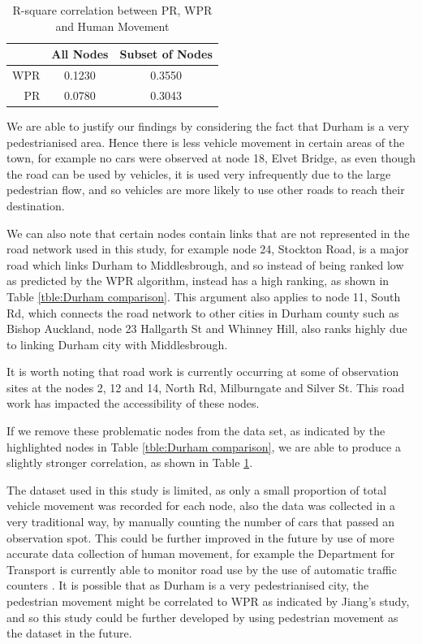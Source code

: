 \documentclass[11pt]{report}
\begin{document}
\begin{table}\caption{R-square correlation between PR, WPR and Human Movement}
\centering
\begin{tabular}{r| c|c}
 & All Nodes& Subset of Nodes \\
 \hline
 WPR & 0.1230 & 0.3550\\
 PR & 0.0780 & 0.3043\\ 
\end{tabular}
\label{tble:Correlation}
\end{table}

We are able to justify our findings by considering the fact that Durham is a very pedestrianised area. Hence there is less vehicle movement in certain areas of the town, for example no cars were observed at node 18, Elvet Bridge, as even though the road can be used by vehicles, it is used very infrequently due to the large pedestrian flow, and so vehicles are more likely to use other roads to reach their destination. 

We can also note that certain nodes contain links that are not represented in the road network used in this study, for example node 24, Stockton Road, is a major road which links Durham to Middlesbrough, and so instead of being ranked low as predicted by the WPR algorithm, instead has a high ranking, as shown in Table \ref{tble:Durham comparison}. This argument also applies to node 11, South Rd, which connects the road network to other cities in Durham county such as Bishop Auckland, node 23 Hallgarth St and Whinney Hill, also ranks highly due to linking Durham city with Middlesbrough. 	

It is worth noting that road work is currently occurring at some of observation sites at the nodes 2, 12 and 14, North Rd, Milburngate and Silver St. This road work has impacted the accessibility of these nodes.

If we remove these problematic nodes from the data set, as indicated by the highlighted nodes in Table \ref{tble:Durham comparison}, we are able to produce a slightly stronger correlation, as shown in Table \ref{tble:Correlation}.

The dataset used in this study is limited, as only a small proportion of total vehicle movement was recorded for each node, also the data was collected in a very traditional way, by manually counting the number of cars that passed an observation spot. This could be further improved in the future by use of more accurate data collection of human movement, for example the Department for Transport is currently able to monitor road use by the use of automatic traffic counters \cite{transport}. It is possible that as Durham is a very pedestrianised city, the pedestrian movement might be correlated to WPR as indicated by Jiang's study, and so this study could be further developed by using pedestrian movement as the dataset in the future.
\end{document}
